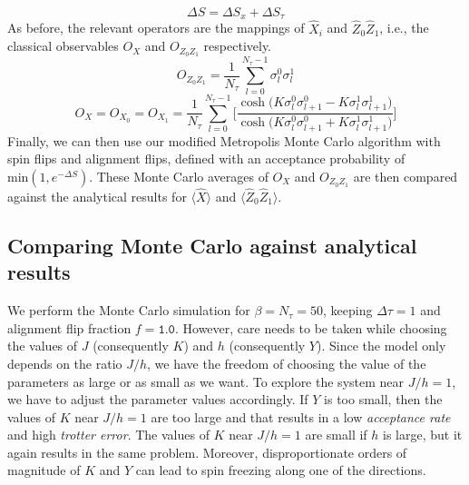 \documentclass[../thesis_main.tex]{subfiles}
\begin{document}
\begin{equation}
    \Delta S = \Delta S_x + \Delta S_\tau 
\end{equation}
As before, the relevant operators are the mappings of $\hat{X}_i$ and $\hat{Z}_0 \hat{Z}_1$, i.e., the classical observables $O_{X}$ and $O_{Z_0 Z_1}$ respectively.
\begin{equation}
    O_{Z_0 Z_1} = \frac{1}{N_\tau} \sum_{l=0}^{N_\tau - 1} \sigma^0_l \sigma^1_l
\end{equation}
\begin{equation}
    O_X = O_{X_0} = O_{X_1} = \frac{1}{N_\tau} \sum_{l=0}^{N_\tau -1} \Bigg[\frac{\cosh\big( K \sigma^0_l \sigma^0_{l+1} - K \sigma^1_l \sigma^1_{l+1} \big)}{\cosh\big( K \sigma^0_l \sigma^0_{l+1} + K \sigma^1_l \sigma^1_{l+1} \big)}  \Bigg]
\end{equation}
Finally, we can then use our modified Metropolis Monte Carlo algorithm with spin flips and alignment flips, defined with an acceptance probability of $\text{min} (1, e^{-\Delta S})$. These Monte Carlo averages of $O_X$ and $O_{Z_0 Z_1}$ are then compared against the analytical results for $\langle \hat{X} \rangle$ and $\langle \hat{Z}_0 \hat{Z}_1\rangle$.

\subsection{Comparing Monte Carlo against analytical results}

We perform the Monte Carlo simulation for $\beta = N_\tau = 50$, keeping $\Delta \tau = 1$ and alignment flip fraction $f = \texttt{1.0}$. However, care needs to be taken while choosing the values of $J$ (consequently $K$) and $h$ (consequently $Y$). Since the model only depends on the ratio $J/h$, we have the freedom of choosing the value of the parameters as large or as small as we want. To explore the system near $J/h = 1$, we have to adjust the parameter values accordingly. If $Y$ is too small, then the values of $K$ near $J/h = 1$ are too large and that results in a low \textit{acceptance rate} and high \textit{trotter error}. The values of $K$ near $J/h = 1$ are small if $h$ is large, but it again results in the same problem. Moreover, disproportionate orders of magnitude of $K$ and $Y$ can lead to spin freezing along one of the directions.
\end{document}
